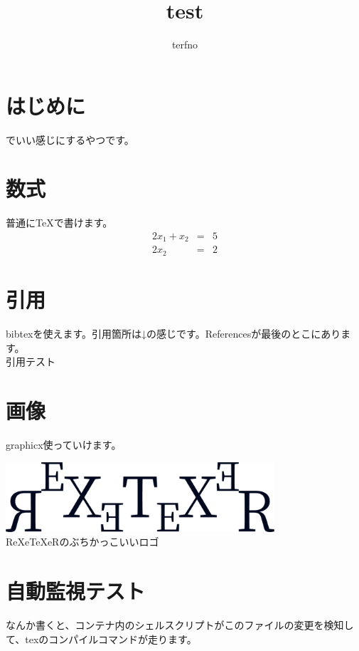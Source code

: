 \documentclass[a4paper]{article}
\begin{document}
  \title{test}
  \author{terfno}
  \maketitle

  \section{はじめに}
  {\XeTeX} でいい感じにするやつです。

  \section{数式}
  普通に{\TeX}で書けます。
  \begin{eqnarray}
    2x_1 + x_2 & = & 5 \nonumber \\
    2x_2 & = & 2 \nonumber
  \end{eqnarray}

  \section{引用}
  bibtexを使えます。引用箇所は↓の感じです。Referencesが最後のとこにあります。\\
  引用テスト\cite{lecun2015deep}

  \section{画像}
  graphicx使っていけます。
  \begin{center}
    \includegraphics[width=10cm]{img/logo.png} \\
    ReXeTeXeRのぶちかっこいいロゴ
  \end{center}

  \section{自動監視テスト}
  なんか書くと、コンテナ内のシェルスクリプトがこのファイルの変更を検知して、texのコンパイルコマンドが走ります。

  
  
\end{document}
